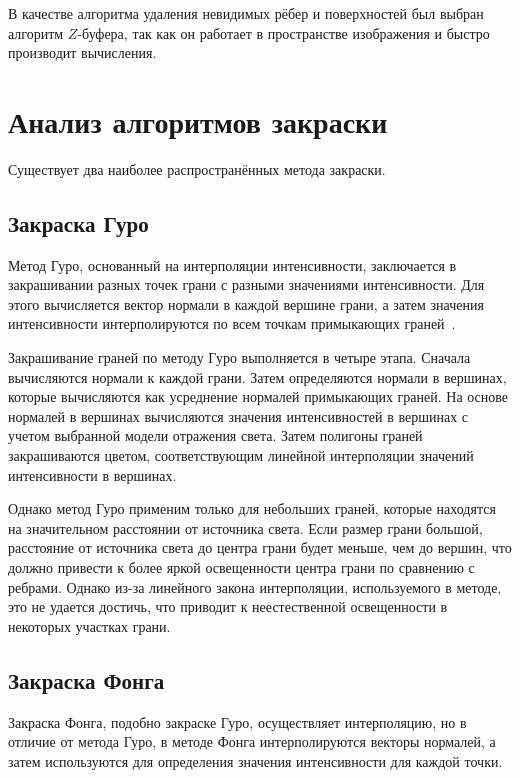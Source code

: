 В качестве алгоритма удаления невидимых рёбер и поверхностей был выбран алгоритм $Z$-буфера, так как он работает в пространстве изображения и быстро производит вычисления.

\clearpage

\section{Анализ алгоритмов закраски}

Существует два наиболее распространённых метода закраски.

\subsection{Закраска Гуро}

Метод Гуро, основанный на интерполяции интенсивности, заключается в закрашивании разных точек грани с разными значениями интенсивности. Для этого вычисляется вектор нормали в каждой вершине грани, а затем значения интенсивности интерполируются по всем точкам примыкающих граней~\cite{roders}.

Закрашивание граней по методу Гуро выполняется в четыре этапа. Сначала вычисляются нормали к каждой грани. Затем определяются нормали в вершинах, которые вычисляются как усреднение нормалей примыкающих граней. На основе нормалей в вершинах вычисляются значения интенсивностей в вершинах с учетом выбранной модели отражения света. Затем полигоны граней закрашиваются цветом, соответствующим линейной интерполяции значений интенсивности в вершинах.

Однако метод Гуро применим только для небольших граней, которые находятся на значительном расстоянии от источника света. Если размер грани большой, расстояние от источника света до центра грани будет меньше, чем до вершин, что должно привести к более яркой освещенности центра грани по сравнению с ребрами. Однако из-за линейного закона интерполяции, используемого в методе, это не удается достичь, что приводит к неестественной освещенности в некоторых участках грани.

\subsection{Закраска Фонга}

Закраска Фонга, подобно закраске Гуро, осуществляет интерполяцию, но в отличие от метода Гуро, в методе Фонга интерполируются векторы нормалей, а затем используются для определения значения интенсивности для каждой точки.

